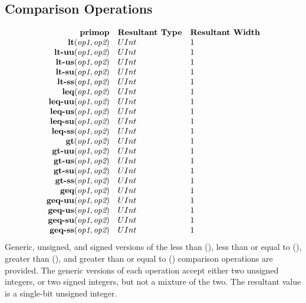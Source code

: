 \documentclass[12pt]{article}
\begin{document}
\subsection{Comparison Operations}
\[
\begin{array}{rll}
\text{\bf primop} & \text{\bf Resultant Type} & \text{\bf Resultant Width} \\
\text{\bf lt}         (\text{\em op1}, \text{\em op2}) & UInt & 1    \\
\text{\bf lt-uu}      (\text{\em op1}, \text{\em op2}) & UInt & 1    \\
\text{\bf lt-us}      (\text{\em op1}, \text{\em op2}) & UInt & 1    \\
\text{\bf lt-su}      (\text{\em op1}, \text{\em op2}) & UInt & 1    \\
\text{\bf lt-ss}      (\text{\em op1}, \text{\em op2}) & UInt & 1    \\
\text{\bf leq}        (\text{\em op1}, \text{\em op2}) & UInt & 1    \\
\text{\bf leq-uu}     (\text{\em op1}, \text{\em op2}) & UInt & 1    \\
\text{\bf leq-us}     (\text{\em op1}, \text{\em op2}) & UInt & 1    \\
\text{\bf leq-su}     (\text{\em op1}, \text{\em op2}) & UInt & 1    \\
\text{\bf leq-ss}     (\text{\em op1}, \text{\em op2}) & UInt & 1    \\
\text{\bf gt}         (\text{\em op1}, \text{\em op2}) & UInt & 1    \\
\text{\bf gt-uu}      (\text{\em op1}, \text{\em op2}) & UInt & 1    \\
\text{\bf gt-us}      (\text{\em op1}, \text{\em op2}) & UInt & 1    \\
\text{\bf gt-su}      (\text{\em op1}, \text{\em op2}) & UInt & 1    \\
\text{\bf gt-ss}      (\text{\em op1}, \text{\em op2}) & UInt & 1    \\
\text{\bf geq}        (\text{\em op1}, \text{\em op2}) & UInt & 1    \\
\text{\bf geq-uu}     (\text{\em op1}, \text{\em op2}) & UInt & 1    \\
\text{\bf geq-us}     (\text{\em op1}, \text{\em op2}) & UInt & 1    \\
\text{\bf geq-su}     (\text{\em op1}, \text{\em op2}) & UInt & 1    \\
\text{\bf geq-ss}     (\text{\em op1}, \text{\em op2}) & UInt & 1    \\
\end{array}
\]
Generic, unsigned, and signed versions of the less than (), less than or equal to (), greater than (), and greater than or equal to () comparison operations are provided.
The generic versions of each operation accept either two unsigned integers, or two signed integers, but not a mixture of the two.
The resultant value is a single-bit unsigned integer.
\end{document}
